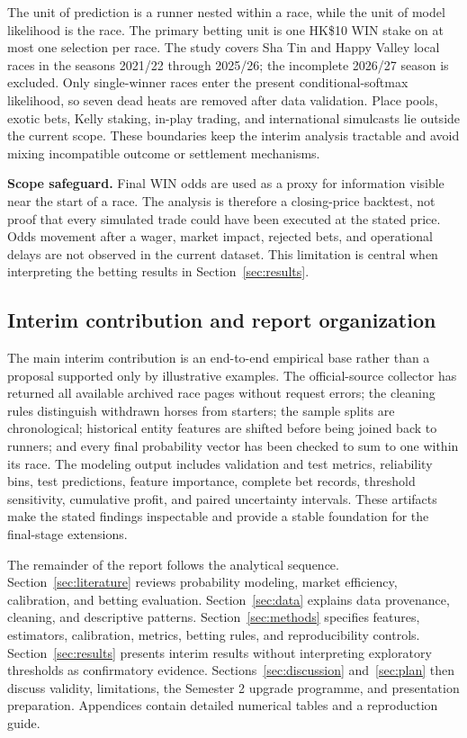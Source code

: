 The unit of prediction is a runner nested within a race, while the unit of model likelihood is the race. The primary betting unit is one HK\$10 WIN stake on at most one selection per race. The study covers Sha Tin and Happy Valley local races in the seasons 2021/22 through 2025/26; the incomplete 2026/27 season is excluded. Only single-winner races enter the present conditional-softmax likelihood, so seven dead heats are removed after data validation. Place pools, exotic bets, Kelly staking, in-play trading, and international simulcasts lie outside the current scope. These boundaries keep the interim analysis tractable and avoid mixing incompatible outcome or settlement mechanisms.

\begin{tcolorbox}[capstonebox]
\textbf{Scope safeguard.} Final WIN odds are used as a proxy for information visible near the start of a race. The analysis is therefore a closing-price backtest, not proof that every simulated trade could have been executed at the stated price. Odds movement after a wager, market impact, rejected bets, and operational delays are not observed in the current dataset. This limitation is central when interpreting the betting results in Section~\ref{sec:results}.
\end{tcolorbox}

\subsection{Interim contribution and report organization}\label{sec:contribution}
The main interim contribution is an end-to-end empirical base rather than a proposal supported only by illustrative examples. The official-source collector has returned all available archived race pages without request errors; the cleaning rules distinguish withdrawn horses from starters; the sample splits are chronological; historical entity features are shifted before being joined back to runners; and every final probability vector has been checked to sum to one within its race. The modeling output includes validation and test metrics, reliability bins, test predictions, feature importance, complete bet records, threshold sensitivity, cumulative profit, and paired uncertainty intervals. These artifacts make the stated findings inspectable and provide a stable foundation for the final-stage extensions.

The remainder of the report follows the analytical sequence. Section~\ref{sec:literature} reviews probability modeling, market efficiency, calibration, and betting evaluation. Section~\ref{sec:data} explains data provenance, cleaning, and descriptive patterns. Section~\ref{sec:methods} specifies features, estimators, calibration, metrics, betting rules, and reproducibility controls. Section~\ref{sec:results} presents interim results without interpreting exploratory thresholds as confirmatory evidence. Sections~\ref{sec:discussion} and~\ref{sec:plan} then discuss validity, limitations, the Semester 2 upgrade programme, and presentation preparation. Appendices contain detailed numerical tables and a reproduction guide.
